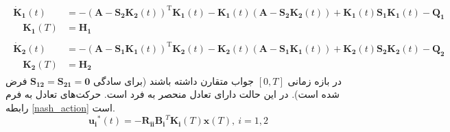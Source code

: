 \begin{align}
	\begin{split}
		\boldsymbol{\dot{K}_1}(t) &= -(\boldsymbol{A}-\boldsymbol{S_2}\boldsymbol{K_2}(t))^\mathrm{T}\boldsymbol{K_1}(t)-\boldsymbol{K_1}(t)(\boldsymbol{A}-\boldsymbol{S_2K_2}(t))+
		\boldsymbol{K_1}(t)\boldsymbol{S_1K_1}(t)-\boldsymbol{Q_1}\\
		\quad \boldsymbol{K_1}(T) &= \boldsymbol{H_1}
	\end{split}\\
	\begin{split}
		\boldsymbol{\dot{K}_2}(t) &= -(\boldsymbol{A}-\boldsymbol{S_1}\boldsymbol{K_1}(t))^\mathrm{T}\boldsymbol{K_2}(t)-\boldsymbol{K_2}(t)(\boldsymbol{A}-\boldsymbol{S_1K_1}(t))+
\boldsymbol{K_2}(t)\boldsymbol{S_2K_2}(t)-\boldsymbol{Q_2}\\
\quad \boldsymbol{K_2}(T) &= \boldsymbol{H_2}
	\end{split}
\end{align}
در بازه زمانی 
$[0, T]$
جواب متقارن داشته ‌باشند (برای سادگی 
$\boldsymbol{S_{12}}=\boldsymbol{S_{21}} =\boldsymbol 0 $
فرض شده است).
در این حالت دارای تعادل منحصر به فرد است. حرکت‌های تعادل به فرم رابطه
\ref{nash_action}
است.
\begin{equation}\label{nash_action}
	\boldsymbol{u_i}^*(t) = -\boldsymbol{R_{ii}B_i}^T\boldsymbol{K_i}(T)\boldsymbol{x}(T),~i = 1, 2
\end{equation}
